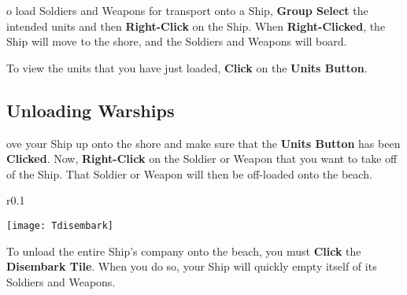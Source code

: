 o load Soldiers and Weapons for transport onto a Ship, \textbf{Group Select} the intended units and then \textbf{Right-Click} on the Ship. When \textbf{Right-Clicked}, the Ship will move to the shore, and the Soldiers and Weapons will board.

To view the units that you have just loaded, \textbf{Click} on the \textbf{Units Button}.

\subsection{{Unloading Warships}}

ove your Ship up onto the shore and make sure that the \textbf{Units Button} has been \textbf{Clicked}. Now, \textbf{Right-Click} on the Soldier or Weapon that you want to take off of the Ship. That Soldier or Weapon will then be off-loaded onto the beach.

\begin{wrapfigure}{r}{0.1\textwidth}
    \vspace{-20pt}
    \begin{center}
        \texttt{[image: Tdisembark]}
    \end{center}
    \vspace{-20pt}
\end{wrapfigure}

To unload the entire Ship’s company onto the beach, you must \textbf{Click} the \textbf{Disembark Tile}. When you do so, your Ship will quickly empty itself of its Soldiers and Weapons.